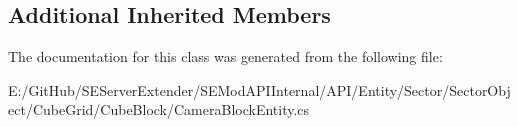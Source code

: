 \subsection*{Additional Inherited Members}


The documentation for this class was generated from the following file\+:\begin{DoxyCompactItemize}
\item 
E\+:/\+Git\+Hub/\+S\+E\+Server\+Extender/\+S\+E\+Mod\+A\+P\+I\+Internal/\+A\+P\+I/\+Entity/\+Sector/\+Sector\+Object/\+Cube\+Grid/\+Cube\+Block/Camera\+Block\+Entity.\+cs\end{DoxyCompactItemize}
